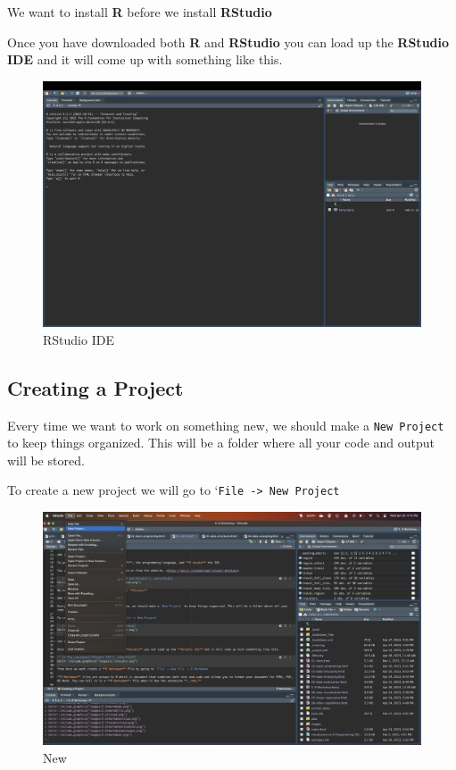 \documentclass[
]{book}
\begin{document}
We want to install \textbf{R} before we install \textbf{RStudio}

Once you have downloaded both \textbf{R} and \textbf{RStudio} you can load up the \textbf{RStudio IDE} and it will come up with something like this.

\begin{figure}
\includegraphics[width=50in]{images/2.3rstudio} \caption{RStudio IDE}\label{fig:unnamed-chunk-3}
\end{figure}

\hypertarget{creating-a-project}{%
\subsection{Creating a Project}\label{creating-a-project}}

Every time we want to work on something new, we should make a \texttt{New\ Project} to keep things organized. This will be a folder where all your code and output will be stored.

To create a new project we will go to `\texttt{File\ -\textgreater{}\ New\ Project}

\begin{figure}
\includegraphics[width=49.83in]{images/2.10newproject} \caption{New}\label{fig:unnamed-chunk-4}
\end{figure}
\end{document}
